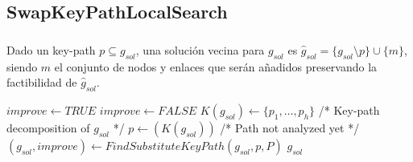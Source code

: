 \subsection{SwapKeyPathLocalSearch}
\begin{frame}\frametitle{}
\begin{small}
\begin{definition}
Dado un key-path $p \subseteq g_{sol}$, una solución vecina para $g_{sol}$ es 
$\hat{g}_{sol} = \{ g_{sol}\setminus p \}\cup \{m\}$, 
siendo $m$ el conjunto de nodos y enlaces que serán añadidos preservando la factibilidad de ${\hat{g}}_{sol}$.  
\end{definition}
\end{small}
\begin{block}{}
\begin{algorithm}[H]
\caption{$g_{sol} = SwapKeyPathLocalSearch(G_B,C,g_{sol},P)$}
\begin{algorithmic}[1]
\begin{scriptsize}
\STATE $improve \leftarrow TRUE$
\STATE $improve \leftarrow FALSE$
\STATE $K(g_{sol}) \leftarrow \{p_1,\ldots,p_h\}$ /* Key-path decomposition of $g_{sol}$ */
\STATE $p \leftarrow(K(g_{sol}))$ /* Path not analyzed yet */
\STATE $(g_{sol},improve) \leftarrow FindSubstituteKeyPath(g_{sol},p,P)$
\ENDWHILE
\ENDWHILE
\RETURN $g_{sol}$
\end{scriptsize}
\end{algorithmic}
\end{algorithm}
\end{block}
\end{frame}

